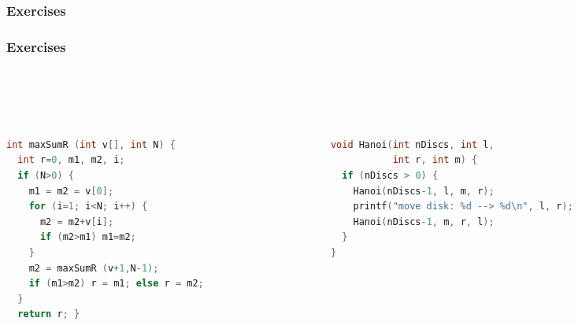 \documentclass[aspectratio=169]{beamer}
\begin{document}


\begin{frame}[fragile]\frametitle{Exercises}

\end{frame}

\begin{frame}[fragile]\frametitle{Exercises}
~\\[-8mm]
~\\[-12mm]
~\\[-8mm]
\begin{columns}
\begin{column}{0.48\textwidth}
\begin{lstlisting}[language=C++,emph={maxSumR}]
int maxSumR (int v[], int N) {
  int r=0, m1, m2, i;
  if (N>0) {
    m1 = m2 = v[0];
    for (i=1; i<N; i++) {
      m2 = m2+v[i];
      if (m2>m1) m1=m2;
    }
    m2 = maxSumR (v+1,N-1);
    if (m1>m2) r = m1; else r = m2;
  }
  return r; }
\end{lstlisting}
\end{column}
\begin{column}{0.48\textwidth}
\begin{lstlisting}[language=C++,emph={Hanoi}]
void Hanoi(int nDiscs, int l,
           int r, int m) {
  if (nDiscs > 0) {
    Hanoi(nDiscs-1, l, m, r);
    printf("move disk: %d --> %d\n", l, r);
    Hanoi(nDiscs-1, m, r, l);
  }
}
\end{lstlisting}
\end{column}
\end{columns}

\end{frame}
\end{document}
